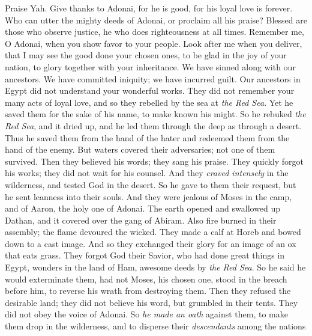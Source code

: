 \begin{biblechapter} %
 Praise Yah. Give thanks to Adonai, for he is good, 
for his loyal love is forever.
\verse Who can utter the mighty deeds of Adonai, 
or proclaim all his praise?
\verse Blessed are those who observe justice, 
he who does righteousness at all times.
\verse Remember me, O Adonai, when you show favor to your people. 
Look after me when you deliver,
\verse that I may see the good done your chosen ones, 
to be glad in the joy of your nation, 
to glory together with your inheritance.
\verse We have sinned along with our ancestors. 
We have committed iniquity; we have incurred guilt.
\verse Our ancestors in Egypt did not understand your wonderful works. 
They did not remember your many acts of loyal love, 
and so they rebelled by the sea at \textit{the Red Sea}.
\verse Yet he saved them for the sake of his name, 
to make known his might.
\verse So he rebuked \textit{the Red Sea}, and it dried up, 
and he led them through the deep as through a desert.
\verse Thus he saved them from the hand of the hater 
and redeemed them from the hand of the enemy.
\verse But waters covered their adversaries; 
not one of them survived.
\verse Then they believed his words; 
they sang his praise.
\verse They quickly forgot his works; 
they did not wait for his counsel.
\verse And they \textit{craved intensely} in the wilderness, 
and tested God in the desert.
\verse So he gave to them their request, 
but he sent leanness into their souls.
\verse And they were jealous of Moses in the camp, 
and of Aaron, the holy one of Adonai.
\verse The earth opened and swallowed up Dathan, 
and it covered over the gang of Abiram.
\verse Also fire burned in their assembly; 
the flame devoured the wicked.
\verse They made a calf at Horeb 
and bowed down to a cast image.
\verse And so they exchanged their glory 
for an image of an ox that eats grass.
\verse They forgot God their Savior, 
who had done great things in Egypt,
\verse wonders in the land of Ham, 
awesome deeds by \textit{the Red Sea}.
\verse So he said he would exterminate them, 
had not Moses, his chosen one, 
stood in the breach before him, 
to reverse his wrath from destroying them.
\verse Then they refused the desirable land; 
they did not believe his word,
\verse but grumbled in their tents. 
They did not obey the voice of Adonai.
\verse So \textit{he made an oath} against them, 
to make them drop in the wilderness,
\verse and to disperse their \textit{descendants} among the nations 

\end{biblechapter}
